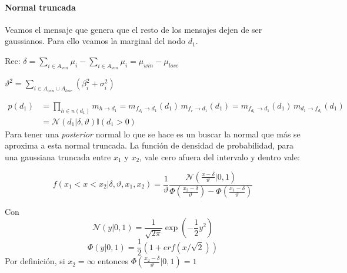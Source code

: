 \documentclass[11pt,twoside,spanish]{report} %
\begin{document}
\paragraph{Normal truncada}\label{appendix:truncada}
Veamos el mensaje que genera que el resto de los mensajes dejen de ser gaussianos. Para ello veamos la marginal del nodo $d_1$.

Rec: $\delta = \sum_{i\in A_{win}}\mu_i-\sum_{i\in A_{win}}\mu_i= \mu_{win}-\mu_{lose}$

$\vartheta^2 = \sum_{i\in A_{win}\cup A_{lose}}(\beta_i^2+\sigma_i^2)	$

\begin{equation}\label{eq:p_d}
	\begin{split}
		p(d_1) & =  \prod_{h \in n(d_1)} m_{h \rightarrow d_1} = m_{f_{d_1} \rightarrow d_1}(d_1) \, m_{f_r \rightarrow d_1}(d_1) = m_{f_{d_1} \rightarrow d_1}(d_1) \, m_{d_1 \rightarrow f_{d_1}}(d_1)  \\
		& = \mathcal{N}(d_1|\delta,\vartheta) \mathbb{I}(d_1 > 0)
	\end{split}
\end{equation}
Para tener una \textit{posterior} normal lo que se hace es un buscar la normal que m\'as se aproxima a esta normal truncada.
La funci\'on de densidad de probabilidad, para una gaussiana truncada entre $x_1$ y $x_2$, vale cero afuera del intervalo  y dentro vale:

\begin{equation}
	f(x_1<x<x_2|\delta,\vartheta,x_1,x_2) = \frac{1}{\vartheta}\frac{\mathcal{N}\left(\frac{x-\delta}{\vartheta}|0,1\right)}{\Phi\left(\frac{x_2-\delta}{\vartheta}\right)-\Phi\left(\frac{x_1-\delta}{\vartheta}\right)}
\end{equation}

Con
\begin{equation}
	\mathcal{N}(y|0,1) = \frac{1}{\sqrt{2\pi}}\exp\left(-\frac{1}{2}y^2\right)
\end{equation}
\begin{equation}
	\Phi(y|0,1) = \frac{1}{2}(1+erf(x/\sqrt{2}))
\end{equation}
Por definici\'on, si $x_2=\infty$ entonces $\Phi\left(\frac{x_2-\delta}{\vartheta}|0,1\right)=1$
\end{document}
